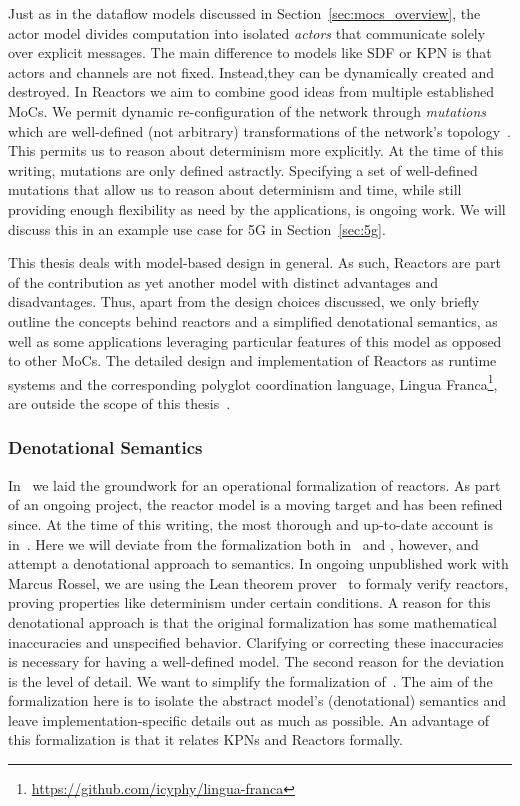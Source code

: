 Just as in the dataflow models discussed in Section~\ref{sec:mocs_overview}, the actor model divides computation into isolated \emph{actors} that communicate solely over explicit messages.
The main difference to models like \ac{SDF} or \ac{KPN} is that actors and channels are not fixed.
Instead,they can be dynamically created and destroyed.
In Reactors we aim to combine good ideas from multiple established \acp{MoC}.
We permit dynamic re-configuration of the network through \emph{mutations} which are well-defined (not arbitrary) transformations of the network's topology~\cite{lohstroh_cyphy19}.
This permits us to reason about determinism more explicitly. 
At the time of this writing, mutations are only defined astractly.
Specifying a set of well-defined mutations that allow us to reason about determinism and time, while still providing enough flexibility as need by the applications, is ongoing work.
We will discuss this in an example use case for 5G in Section~\ref{sec:5g}.

This thesis deals with model-based design in general.
As such, Reactors are part of the contribution as yet another model with distinct advantages and disadvantages.
Thus, apart from the design choices discussed, we only briefly outline the concepts behind reactors and a simplified denotational semantics, as well as some applications leveraging particular features of this model as opposed to other \acp{MoC}.
The detailed design and implementation of Reactors as runtime systems and the corresponding polyglot coordination language, Lingua Franca\footnote{\url{https://github.com/icyphy/lingua-franca}}, are outside the scope of this thesis~\cite{lingua_franca,lohstroh_phdthesis}.

\subsubsection{Denotational Semantics}

In~\cite{lohstroh_cyphy19} we laid the groundwork for an operational formalization of reactors.
As part of an ongoing project, the reactor model is a moving target and has been refined since.
At the time of this writing, the most thorough and up-to-date account is in~\cite{lohstroh_phdthesis}.
Here we will deviate from the formalization both in~\cite{lohstroh_cyphy19} and \cite{lohstroh_phdthesis}, however, and attempt a denotational approach to semantics.
In ongoing unpublished work with Marcus Rossel, we are using the Lean theorem prover~\cite{lean} to formaly verify reactors, proving properties like determinism under certain conditions.
A reason for this denotational approach is that the original formalization has some mathematical inaccuracies and unspecified behavior.
Clarifying or correcting these inaccuracies is necessary for having a well-defined model.
The second reason for the deviation is the level of detail.
We want to simplify the formalization of~\cite{lohstroh_cyphy19,lohstroh_phdthesis}.
The aim of the formalization here is to isolate the abstract model's (denotational) semantics and leave implementation-specific details out as much as possible.
An advantage of this formalization is that it relates \acp{KPN} and Reactors formally.

